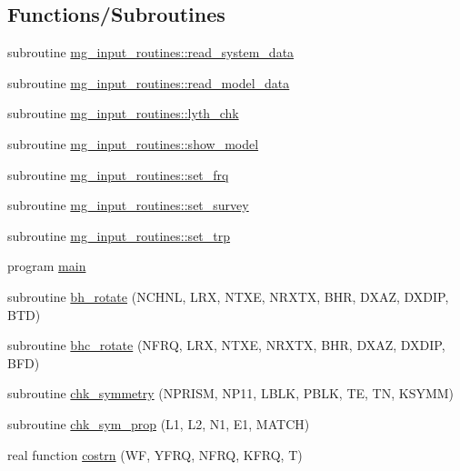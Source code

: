 \subsection*{Functions/\+Subroutines}
\begin{DoxyCompactItemize}
\item 
subroutine \hyperlink{namespacemg__input__routines_a77a7419ce373edc9895839fc0d469d78}{mg\+\_\+input\+\_\+routines\+::read\+\_\+system\+\_\+data}
\item 
subroutine \hyperlink{namespacemg__input__routines_acd1da063201ad2300b429047265d6c91}{mg\+\_\+input\+\_\+routines\+::read\+\_\+model\+\_\+data}
\item 
subroutine \hyperlink{namespacemg__input__routines_a9e1339657e87110a735f9631657c9019}{mg\+\_\+input\+\_\+routines\+::lyth\+\_\+chk}
\item 
subroutine \hyperlink{namespacemg__input__routines_a01c4f84680a9bc565592f441959beccc}{mg\+\_\+input\+\_\+routines\+::show\+\_\+model}
\item 
subroutine \hyperlink{namespacemg__input__routines_ac8682ae293c93e95b72b4b7c222f9ed4}{mg\+\_\+input\+\_\+routines\+::set\+\_\+frq}
\item 
subroutine \hyperlink{namespacemg__input__routines_af6f593fecea83164d8d0352ef801c23b}{mg\+\_\+input\+\_\+routines\+::set\+\_\+survey}
\item 
subroutine \hyperlink{namespacemg__input__routines_a1b72deaf9809d0b370c1a68cd01e9d32}{mg\+\_\+input\+\_\+routines\+::set\+\_\+trp}
\item 
program \hyperlink{Marco_8f90_a8ec2266d83cd6c0b762cbcbc92c0af3d}{main}
\item 
subroutine \hyperlink{Marco_8f90_a6f9b11cb7ed99f525d6b03e1b3223dee}{bh\+\_\+rotate} (N\+C\+H\+NL, L\+RX, N\+T\+XE, N\+R\+X\+TX, B\+HR, D\+X\+AZ, D\+X\+D\+IP, B\+TD)
\item 
subroutine \hyperlink{Marco_8f90_a88bc2c0947b2f1babf4dade8ee684423}{bhc\+\_\+rotate} (N\+F\+RQ, L\+RX, N\+T\+XE, N\+R\+X\+TX, B\+HR, D\+X\+AZ, D\+X\+D\+IP, B\+FD)
\item 
subroutine \hyperlink{Marco_8f90_a51e4a3fa9046596038f31e4e9a6ac7e5}{chk\+\_\+symmetry} (N\+P\+R\+I\+SM, N\+P11, L\+B\+LK, P\+B\+LK, TE, TN, K\+S\+Y\+MM)
\item 
subroutine \hyperlink{Marco_8f90_a0df391e311aae0e0ab61a43fe99aa856}{chk\+\_\+sym\+\_\+prop} (L1, L2, N1, E1, M\+A\+T\+CH)
\item 
real function \hyperlink{Marco_8f90_afc6a9dcc4e352b5f51fa8b7f42b6e1ad}{costrn} (WF, Y\+F\+RQ, N\+F\+RQ, K\+F\+RQ, T)

\end{DoxyCompactItemize}
